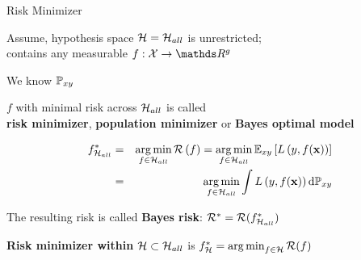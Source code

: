 \documentclass[11pt,compress,t,notes=noshow, xcolor=table]{beamer}
\begin{document}
\begin{vbframe}{Risk Minimizer}

\begin{itemizeM}

\item Assume, hypothesis space $\mathcal{H}=\mathcal{H}_{all}$ is unrestricted;\\
contains any measurable $f: \Xspace \to \R^g$

\item We know $\mathbb{P}_{xy}$

\item $f$ with minimal risk across $\mathcal{H}_{all}$
is called\\
\textbf{risk minimizer}, \textbf{population minimizer} or \textbf{Bayes optimal model}

\begin{eqnarray*}
	f^{\ast}_{\mathcal{H}_{all}} &=& \mathop{\mathrm{arg\,min}}_{f \in \mathcal{H}_{all}} \mathcal{R}\left(f\right) = \mathop{\mathrm{arg\,min}}_{f \in \mathcal{H}_{all}}\mathbb{E}_{xy}\left[L\left(y, f(\mathbf{x})\right)\right]\\ &=&  \mathop{\mathrm{arg\,min}}_{f \in \mathcal{H}_{all}}\int L\left(y, f(\mathbf{x})\right) \text{d}\mathbb{P}_{xy}
\end{eqnarray*}

\item The resulting risk is called \textbf{Bayes risk}:  $\mathcal{R}^\ast_{} = \mathcal{R}(f^{\ast}_{\mathcal{H}_{all}})$

\item \textbf{Risk minimizer within} $\mathcal{H} \subset \mathcal{H}_{all}$ is
$f^{\ast}_{\mathcal{H}} = \mathop{\mathrm{arg\,min}}_{f \in \mathcal{H}} \mathcal{R}(f)$

\end{itemizeM}

\end{vbframe}





\end{document}
